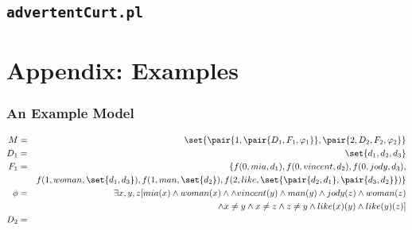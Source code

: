 \documentclass[notitlepage,twoside,a4paper]{scrreprt}
\newcommand{\code}[1]{\texttt{#1}} %
\theoremstyle{remark}
\theoremstyle{remark}
\theoremstyle{definition}
\theoremstyle{definition}
\begin{document}
\section{\code{advertentCurt.pl}}


\chapter{Appendix: Examples}

\subsection{An Example Model} \label{sec:examplemodel}

\begin{eqnarray*}
  M &=& \set{\pair{1,\pair{D_1,F_1,\varphi_1}},\pair{2,D_2,F_2,\varphi_2}} \\
  D_1 &=& \set{d_1,d_2,d_3} \\
  F_1 &=& \{f(0,mia,d_1), f(0,vincent,d_2), f(0,jody,d_3),\\
  && f(1,woman,\set{ d_1,d_3 }), f(1,man,\set{ d_2 }),
  f(2,like,\set{\pair{d_2,d_1},\pair{d_3,d_2}})\} \\
  \phi &=& \exists x,y,z [mia(x)\wedge woman(x)\wedge \wedge vincent(y)\wedge
  man(y)\wedge jody(z)\wedge woman(z) \\&&\wedge x \neq y \wedge x\neq z \wedge z
  \neq y\wedge like(x)(y)\wedge like(y)(z)]\\
  D_2 &=& 
\end{eqnarray*}

\newpage


\end{document}
